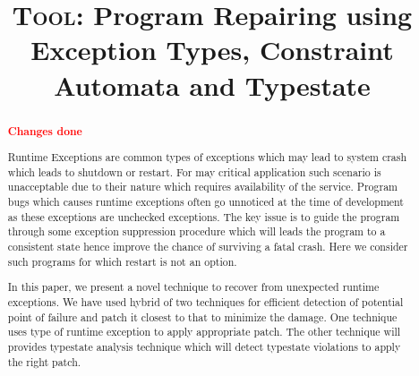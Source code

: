 \documentclass[pldi]{sigplanconf}
\def\tool{\textsc{Tool}\xspace}
\def\papertitle{\tool: Program Repairing using Exception Types, Constraint
Automata and Typestate}
\begin{document}
\title{\Large \bf \papertitle}

\maketitle

\begin{abstract}
\small
\textcolor{red}{\textbf{Changes done}}\newline

Runtime Exceptions are common types of exceptions which may lead to system crash
which leads to shutdown or restart. For may critical application such scenario
is unacceptable due to their nature which requires availability of the service. 
Program bugs which causes runtime exceptions often go unnoticed at the time of
development as these exceptions are unchecked exceptions. The key issue is to
guide the program through some exception suppression procedure which will leads
the program to a consistent state hence improve the chance of surviving a fatal
crash. Here we consider such programs for which restart is not an option.

In this paper, we present a novel technique to recover from unexpected runtime
exceptions. We have used hybrid of two techniques for efficient detection of
potential point of failure and patch it closest to that to minimize the damage. 
One technique uses type of runtime exception to apply appropriate patch. The
other technique will provides typestate analysis technique which will detect
typestate violations to apply the right patch.

\end{abstract}

% 














\raggedright
\small


\end{document}
